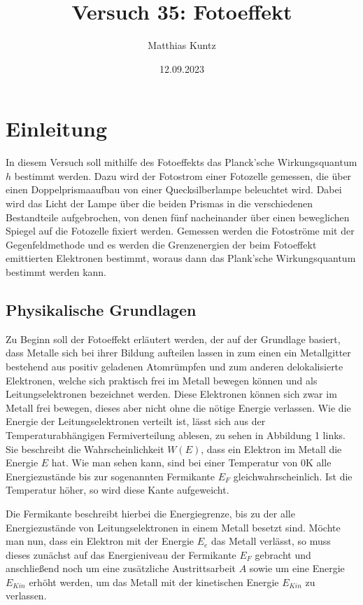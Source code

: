 \documentclass{article}
\title{Versuch 35: Fotoeffekt}
\author{Matthias Kuntz}
\date{12.09.2023}
\begin{document}
\maketitle

\section{Einleitung}

In diesem Versuch soll mithilfe des Fotoeffekts das Planck'sche Wirkungsquantum $h$ bestimmt werden. Dazu wird der Fotostrom einer Fotozelle gemessen, die über einen Doppelprismaaufbau von einer Quecksilberlampe beleuchtet wird. Dabei wird das Licht der Lampe über die beiden Prismas in die verschiedenen Bestandteile aufgebrochen, von denen fünf nacheinander über einen beweglichen Spiegel auf die Fotozelle fixiert werden. Gemessen werden die Fotoströme mit der Gegenfeldmethode und es werden die Grenzenergien der beim Fotoeffekt emittierten Elektronen bestimmt, woraus dann das Plank'sche Wirkungsquantum bestimmt werden kann.  

\subsection{Physikalische Grundlagen}

Zu Beginn soll der Fotoeffekt erläutert werden, der auf der Grundlage basiert, dass Metalle sich bei ihrer Bildung aufteilen lassen in zum einen ein Metallgitter bestehend aus positiv geladenen Atomrümpfen und zum anderen delokalisierte Elektronen, welche sich praktisch frei im Metall bewegen können und als Leitungselektronen bezeichnet werden. Diese Elektronen können sich zwar im Metall frei bewegen, dieses aber nicht ohne die nötige Energie verlassen. Wie die Energie der Leitungselektronen verteilt ist, lässt sich aus der Temperaturabhängigen Fermiverteilung ablesen, zu sehen in Abbildung 1 links. Sie beschreibt die Wahrscheinlichkeit $W(E)$, dass ein Elektron im Metall die Energie $E$ hat. Wie man sehen kann, sind bei einer Temperatur von 0K alle Energiezustände bis zur sogenannten Fermikante $E_F$ gleichwahrscheinlich. Ist die Temperatur höher, so wird diese Kante aufgeweicht. 

Die Fermikante beschreibt hierbei die Energiegrenze, bis zu der alle Energiezustände von Leitungselektronen in einem Metall besetzt sind. Möchte man nun, dass ein Elektron mit der Energie $E_e$ das Metall verlässt, so muss dieses zunächst auf das Energieniveau der Fermikante $E_F$ gebracht und anschließend noch um eine zusätzliche Austrittsarbeit $A$ sowie um eine Energie $E_{Kin}$ erhöht werden, um das Metall mit der kinetischen Energie $E_{Kin}$ zu verlassen. 
\end{document}
